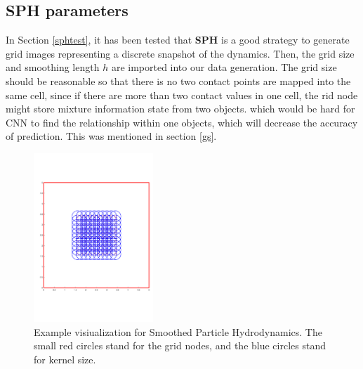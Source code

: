 \subsection{SPH parameters}
    \label{SPH-setting}
    In Section \ref{sphtest}, it has been tested that \textbf{SPH} is a good strategy to generate grid images representing a discrete snapshot of the dynamics. Then, the grid size and smoothing length $h$ are imported into our data generation. The grid size should be reasonable so that there is no two contact points are mapped into the same cell, since if there are more than two contact values in one cell, the rid node might store mixture information state from two objects. which would be hard for CNN to find the relationship within one objects, which will decrease the accuracy of prediction. This was mentioned in section \ref{gs}.
    \begin{figure}[!h]
        \centering
        \includegraphics[width=0.4\textwidth]{Figures/SPHvi.pdf}
        \caption{Example visiualization for Smoothed Particle Hydrodynamics. The small red circles stand for the grid nodes, and the blue circles stand for kernel size.}
    \end{figure}

